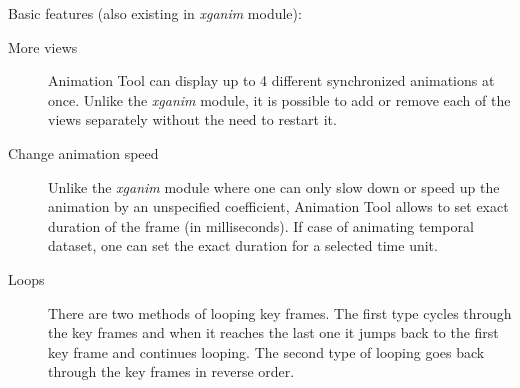 \documentclass[a4paper,12pt,oneside]{book}
\newcommand{\module}[1]{\textsl{#1}}
\newcommand{\at}{Animation Tool\xspace}
\begin{document}
\noindent Basic features (also existing in \module{xganim} module):
\begin{description}
  \item[More views]
  \at can display up to 4 different synchronized animations at once.
    Unlike the \module{xganim} module, it is possible to add or remove each of the views separately
    without the need to restart it.
    \item [Change animation speed]
    Unlike the \module{xganim} module where one can only
    slow down or speed up the animation by an unspecified coefficient, \at allows to set
    exact duration of the frame (in milliseconds). If case of animating temporal dataset,
    one can set the exact duration for a selected time unit.
    \item [Loops]
    There are two methods of looping key frames.
    The first type cycles through the key frames and when it reaches the last one it jumps back
    to the first key frame and continues looping.
    The second type of looping goes back through the key frames in reverse order.
 \end{description}
\end{document}
